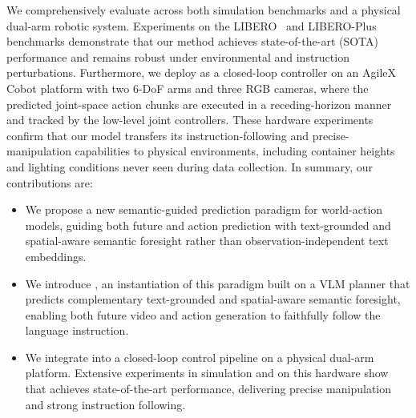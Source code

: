 We comprehensively evaluate \ourmethod across both simulation benchmarks and a physical dual-arm robotic system.
Experiments on the LIBERO~\cite{liu2023libero} and LIBERO-Plus~\cite{liberoplus} benchmarks demonstrate that our method achieves state-of-the-art (SOTA) performance and remains robust under environmental and instruction perturbations.
Furthermore, we deploy \ourmethod as a closed-loop controller on an AgileX Cobot platform with two 6-DoF arms and three RGB cameras, where the predicted joint-space action chunks are executed in a receding-horizon manner and tracked by the low-level joint controllers.
These hardware experiments confirm that our model transfers its instruction-following and precise-manipulation capabilities to physical environments, including container heights and lighting conditions never seen during data collection.
In summary, our contributions are:
\begin{itemize}
    \item We propose a new semantic-guided prediction paradigm for world-action models, guiding both future and action prediction with text-grounded and spatial-aware semantic foresight rather than observation-independent text embeddings.

    \item We introduce \ourmethod, an instantiation of this paradigm built on a VLM planner that predicts complementary text-grounded and spatial-aware semantic foresight, enabling both future video and action generation to faithfully follow the language instruction.

    \item We integrate \ourmethod into a closed-loop control pipeline on a physical dual-arm platform. Extensive experiments in simulation and on this hardware show that \ourmethod achieves state-of-the-art performance, delivering precise manipulation and strong instruction following.
\end{itemize}

